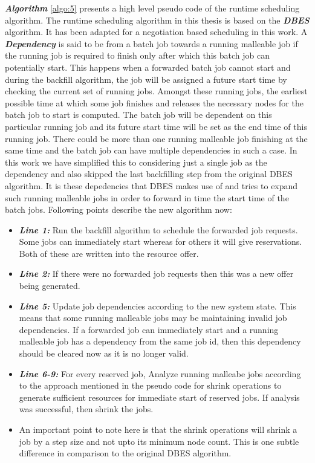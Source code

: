 \textbf{\textit{Algorithm }}\ref{algo:5} presents a high level pseudo code of the runtime scheduling algorithm. The runtime scheduling algorithm in this thesis is based on the \textbf{\textit{DBES}} algorithm\cite{laxmikant}. It has been adapted for a negotiation based scheduling in this work. A \textbf{\textit{Dependency}} is said to be from a batch job towards a running malleable job if the running job is required to finish only after which this batch job can potentially start. This happens when a forwarded batch job cannot start and during the backfill algorithm, the job will be assigned a future start time by checking the current set of running jobs. Amongst these running jobs, the earliest possible time at which some job finishes and releases the necessary nodes for the batch job to start is computed. The batch job will be dependent on this particular running job and its future start time will be set as the end time of this running job. There could be more than one running malleable job finishing at the same time and the batch job can have multiple dependencies in such a case. In this work we have simplified this to considering just a single job as the dependency and also skipped the last backfilling step from the original DBES algorithm. It is these depedencies that DBES makes use of and tries to expand such running malleable jobs in order to forward in time the start time of the batch jobs. Following points describe the new algorithm now:
\begin{itemize}
\item \textbf{\textit{Line 1:}} Run the backfill algorithm to schedule the forwarded job requests. Some jobs can immediately start whereas for others it will give reservations. Both of these are written into the resource offer.
\item \textbf{\textit{Line 2:}} If there were no forwarded job requests then this was a new offer being generated.
\item \textbf{\textit{Line 5:}} Update job dependencies according to the new system state. This means that some running malleable jobs may be maintaining invalid job dependencies. If a forwarded job can immediately start and a running malleable job has a dependency from the same job id, then this dependency should be cleared now as it is no longer valid. 
\item \textbf{\textit{Line 6-9:}} For every reserved job, Analyze running malleabe jobs according to the approach mentioned in the pseudo code for shrink operations to generate sufficient resources for immediate start of reserved jobs. If analysis was successful, then shrink the jobs.
\item An important point to note here is that the shrink operations will shrink a job by a step size and not upto its minimum node count. This is one subtle difference in comparison to the original DBES algorithm. 
\end{itemize}
